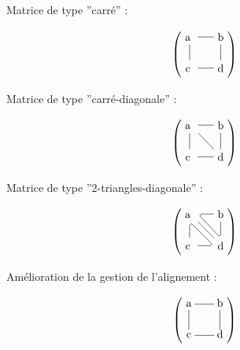 \documentclass[10pt,a4paper]{article}
\begin{document}
Matrice de type ''carré'' :

\[
	\begin{pmatrix}
		\begin{tikzpicture}
			\node (a) at (0,0) {a \vphantom{b}};
			\node (b) at (1,0) {b};
			\node (c) at (0,-1) {c \vphantom{d}};
			\node (d) at (1,-1) {d};

			\draw (a.east) -- (b.west);
			\draw (b.south) -- (d.north);
			\draw (c.east) -- (d.west);
			\draw (a.south) -- (c.north);
		\end{tikzpicture}
	\end{pmatrix}
\]


Matrice de type ''carré-diagonale'' :

\[
	\begin{pmatrix}
		\begin{tikzpicture}
			\node (a) at (0,0) {a \vphantom{b}};
			\node (b) at (1,0) {b};
			\node (c) at (0,-1) {c \vphantom{d}};
			\node (d) at (1,-1) {d};

			\draw (a.east) -- (b.west);		
			\draw (b.south) -- (d.north); 
			\draw (c.east) -- (d.west); 
			\draw (a.south) -- (c.north); 
			\draw (a.south east) -- (d.north west);		 
		\end{tikzpicture}
	\end{pmatrix}
\]


Matrice de type ''2-triangles-diagonale'' :

\[
	\begin{pmatrix}
		\begin{tikzpicture}
			\node (a) at (0,0) {a \vphantom{b}};
			\node (b) at (1,0) {b};
			\node (c) at (0,-1) {c \vphantom{d}};
			\node (d) at (1,-1) {d};

			\draw (a.south east) -- (d.north west); %
			\draw [rounded corners] (b.south)--(d.north)--(a.east)--(b.west); %
			\draw [rounded corners] (c.north)--(a.south)--(d.west)--(c.east); %
		\end{tikzpicture}
	\end{pmatrix}
\]


Amélioration de la gestion de l'alignement :

\[
	\begin{pmatrix}
		\begin{tikzpicture}
			\node[minimum size=1em] (a) at (0,0)  {};
			\node[minimum size=1em] (b) at (1,0)  {};
			\node[minimum size=1em] (c) at (0,-1) {};
			\node[minimum size=1em] (d) at (1,-1) {};

			\begin{scope}[every node/.style={anchor=mid}] 
				\node  at (0,0)  {a};
				\node  at (1,0)  {b};
				\node  at (0,-1) {c};
				\node  at (1,-1) {d};
			\end{scope}

			\draw (a) -- (b);
			\draw (b) -- (d);
			\draw (c) -- (d);
			\draw (a) -- (c);
		\end{tikzpicture}
	\end{pmatrix}
\]
\end{document}

